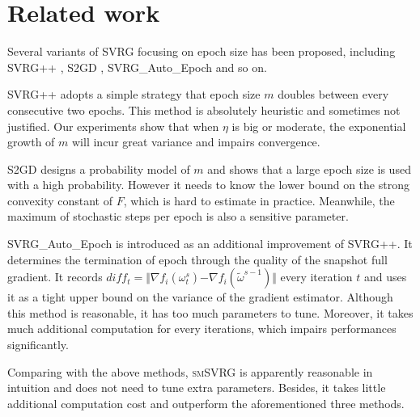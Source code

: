 \documentclass[conference]{IEEEtran}
\begin{document}
\section{Related work}
\label{sectiove_related_work}
Several variants of SVRG focusing on epoch size has been proposed, including SVRG++ \citep{Allen2015Improved}, S2GD \citep{Richtarik:2013te}, SVRG\_Auto\_Epoch \citep{Allen2015Improved} and so on. 

SVRG++ adopts a simple strategy that epoch size $m$ doubles between every consecutive two epochs. This method is absolutely heuristic and sometimes not justified. Our experiments show that when $\eta$ is big or moderate, the exponential growth of $m$ will incur great variance and impairs convergence. 

S2GD designs a probability model of $m$ and shows that a large epoch size is used with a high probability. However it needs to know the lower bound on the strong convexity constant of $F$, which is hard to estimate in practice. Meanwhile, the maximum of stochastic steps per epoch is also a sensitive parameter.

SVRG\_Auto\_Epoch is introduced as an additional improvement of SVRG++. It determines the termination of epoch through the quality of the snapshot full gradient. It records $diff_t = \Vert\nabla f_{i}(\omega_t^s)\mathrm{-}\nabla f_{i}(\tilde{\omega}^{s-1})\Vert$ every iteration $t$ and uses it as a tight upper bound on the variance of the gradient estimator. Although this method is reasonable, it has too much parameters to tune. Moreover, it takes much additional computation for every iterations, which impairs performances significantly. 

Comparing with the above methods, \textsc{smSVRG} is apparently reasonable in intuition and does not need to tune extra parameters. Besides, it takes little additional computation cost and outperform the aforementioned three methods.

\end{document}
